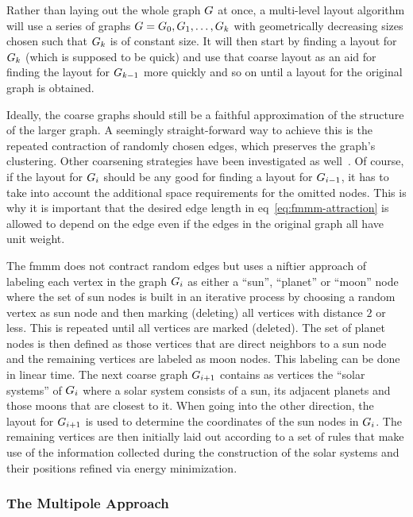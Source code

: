 \documentclass{graphstudy}
\begin{document}
Rather than laying out the whole graph \(G\) at once, a multi-level layout algorithm will use a series of graphs
\(G=G_0,G_1,\ldots,G_k\) with geometrically decreasing sizes chosen such that \(G_k\) is of
constant size.  It will then start by finding a layout for \(G_k\) (which is supposed to be quick) and use that
coarse layout as an aid for finding the layout for \(G_{k-1}\) more quickly and so on until a layout for the
original graph is obtained.

Ideally, the coarse graphs should still be a faithful approximation of the structure of the larger graph.  A seemingly
straight-forward way to achieve this is the repeated contraction of randomly chosen edges, which preserves the graph's
clustering.  Other coarsening strategies have been investigated as well~\cite{Kobourov2013}.  Of course, if the layout
for \(G_i\) should be any good for finding a layout for \(G_{i-1}\), it has to take into account the
additional space requirements for the omitted nodes.  This is why it is important that the desired edge length in
\acl{eq}~\ref{eq:fmmm-attraction} is allowed to depend on the edge even if the edges in the original graph all have unit
weight.

The \ac{fmmm} does not contract random edges but uses a niftier approach of labeling each vertex in the graph
\(G_i\) as either a \enquote{sun}, \enquote{planet} or \enquote{moon} node where the set of sun nodes is built in
an iterative process by choosing a random vertex as sun node and then marking (deleting) all vertices with distance
\(2\) or less.  This is repeated until all vertices are marked (deleted).  The set of planet nodes is then defined as
those vertices that are direct neighbors to a sun node and the remaining vertices are labeled as moon nodes.  This
labeling can be done in linear time.  The next coarse graph \(G_{i+1}\) contains as vertices the \enquote{solar
  systems} of \(G_i\) where a solar system consists of a sun, its adjacent planets and those moons that are closest
to it.  When going into the other direction, the layout for \(G_{i+1}\) is used to determine the coordinates of the
sun nodes in \(G_i\).  The remaining vertices are then initially laid out according to a set of rules that make use
of the information collected during the construction of the solar systems and their positions refined via energy
minimization.

\subsubsection{The Multipole Approach}
\end{document}
